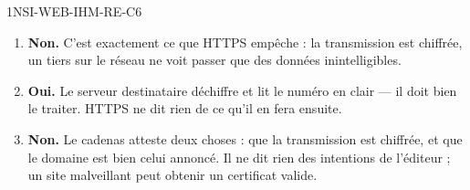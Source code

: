 \begin{corrige}{1NSI-WEB-IHM-RE-C6}
\begin{enumerate}
  \item \textbf{Non.} C'est exactement ce que HTTPS empêche : la transmission est chiffrée,
        un tiers sur le réseau ne voit passer que des données inintelligibles.
  \item \textbf{Oui.} Le serveur destinataire déchiffre et lit le numéro en clair — il doit
        bien le traiter. HTTPS ne dit rien de ce qu'il en fera ensuite.
  \item \textbf{Non.} Le cadenas atteste deux choses : que la transmission est chiffrée, et que
        le domaine est bien celui annoncé. Il ne dit rien des intentions de l'éditeur ; un site
        malveillant peut obtenir un certificat valide.
\end{enumerate}
\end{corrige}
